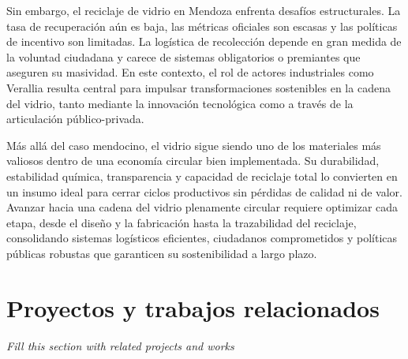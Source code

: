 Sin embargo, el reciclaje de vidrio en Mendoza enfrenta desafíos estructurales. La tasa de recuperación aún es baja, las métricas oficiales son escasas y las políticas de incentivo son limitadas. La logística de recolección depende en gran medida de la voluntad ciudadana y carece de sistemas obligatorios o premiantes que aseguren su masividad. En este contexto, el rol de actores industriales como Verallia resulta central para impulsar transformaciones sostenibles en la cadena del vidrio, tanto mediante la innovación tecnológica como a través de la articulación público-privada.

Más allá del caso mendocino, el vidrio sigue siendo uno de los materiales más valiosos dentro de una economía circular bien implementada. Su durabilidad, estabilidad química, transparencia y capacidad de reciclaje total lo convierten en un insumo ideal para cerrar ciclos productivos sin pérdidas de calidad ni de valor. Avanzar hacia una cadena del vidrio plenamente circular requiere optimizar cada etapa, desde el diseño y la fabricación hasta la trazabilidad del reciclaje, consolidando sistemas logísticos eficientes, ciudadanos comprometidos y políticas públicas robustas que garanticen su sostenibilidad a largo plazo.

\section{Proyectos y trabajos relacionados}


\begin{block}[todo]
    \textit{Fill this section with related projects and works}
\end{block}
